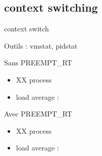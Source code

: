 \subsection{context switching}
\begin{frame}
	\begin{block}{context switch}

Outils : vmstat, pidstat
	\end{block}
	\begin{minipage}[t]{0.48\linewidth}
		\begin{block}{Sans PREEMPT\_RT}
			\begin{itemize}
				\item XX process
				\item load average : 
			\end{itemize}
		\end{block}
	\end{minipage}
	\begin{minipage}[t]{0.48\linewidth}
		\begin{block}{Avec PREEMPT\_RT}
			\begin{itemize}
				\item XX process
				\item load average : 
			\end{itemize}
		\end{block}
	\end{minipage}

\end{frame}

\begin{frame}

\end{frame}

